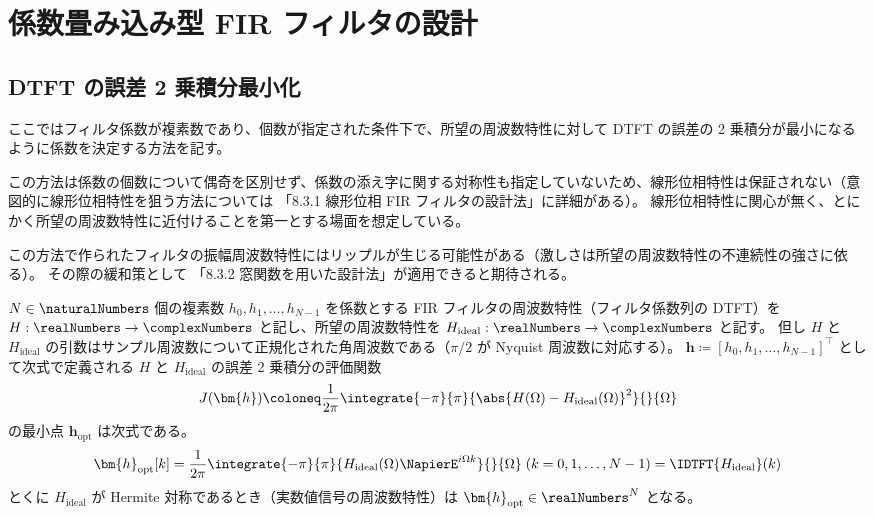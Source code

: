 \section{係数畳み込み型 FIR フィルタの設計}
    \subsection{DTFT の誤差 2 乗積分最小化}
        \newcommand{\Hideal}{H_\text{ideal}}
        \newcommand{\vhOpt}{\bm{h}_\text{opt}}
        ここではフィルタ係数が複素数であり、個数が指定された条件下で、所望の周波数特性に対して DTFT の誤差の 2 乗積分が最小になるように係数を決定する方法を記す。
        \par
        この方法は係数の個数について偶奇を区別せず、係数の添え字に関する対称性も指定していないため、線形位相特性は保証されない（意図的に線形位相特性を狙う方法については \cite{learn_sp_from_basic} 「8.3.1 線形位相 FIR フィルタの設計法」に詳細がある）。
        線形位相特性に関心が無く、とにかく所望の周波数特性に近付けることを第一とする場面を想定している。
        \par
        この方法で作られたフィルタの振幅周波数特性にはリップルが生じる可能性がある（激しさは所望の周波数特性の不連続性の強さに依る）。
        その際の緩和策として \cite{learn_sp_from_basic} 「8.3.2 窓関数を用いた設計法」が適用できると期待される。
        \begin{shadebox}
            $N\in\naturalNumbers$ 個の複素数 $h_0,h_1,\dots,h_{N-1}$ を係数とする FIR フィルタの周波数特性（フィルタ係数列の DTFT）を $H:\realNumbers\to\complexNumbers$ と記し、所望の周波数特性を $\Hideal:\realNumbers\to\complexNumbers$ と記す。
            但し $H$ と $\Hideal$ の引数はサンプル周波数について正規化された角周波数である（$\pi/2$ が Nyquist 周波数に対応する）。
            $\bm{h} \coloneq [h_0,h_1,\dots,h_{N-1}]^\top$ として次式で定義される $H$ と $\Hideal$ の誤差 2 乗積分の評価関数
            \[ J(\bm{h}) \coloneq \frac{1}{2\pi}\integrate{-\pi}{\pi}{\abs{H(\Omega)-\Hideal(\Omega)}^2}{}{\Omega} \]
            の最小点 $\vhOpt$ は次式である。
            \[ \vhOpt[k] = \frac{1}{2\pi}\integrate{-\pi}{\pi}{\Hideal(\Omega)\NapierE^{i\Omega k}}{}{\Omega}\;(k=0,1,\dots,N-1) = \IDTFT{\Hideal}(k) \]
            とくに $\Hideal$ が Hermite 対称であるとき（実数値信号の周波数特性）は $\vhOpt\in\realNumbers^N$ となる。
        \end{shadebox}

